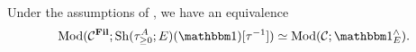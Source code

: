 \begin{rmk}
 Under the assumptions of , we have an equivalence
\[ \Mod(\CC^{\Fil}; \mathrm{Sh}(\tau_{\geq 0}^A ; E)(\o)[\tau^{-1}]) \simeq \Mod(\CC; \o^{\wedge}_{E}). \]
\end{rmk}














